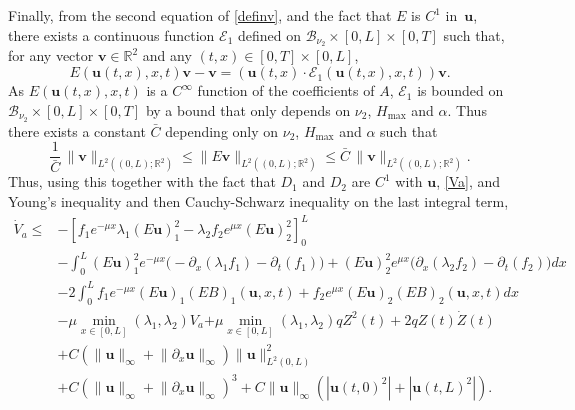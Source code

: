 \documentclass[JEP,XML,SOM,Unicode]{cedram}
\let\mathcal\mathscr
\theoremstyle{definition}
\begin{document}
Finally, from the second equation of \eqref{definv}, and the fact that $E$ is $C^{1}$ in~$\boldsymbol{u}$,
there exists a continuous function {$\mathcal{E}_{1}$} defined on $\mathcal{B}_{\nu_{2}}\times[0,L]\times[0,T]$ such that, for any vector $\boldsymbol{v}\in\mathbb{R}^{2}$ and any $(t,x)\in[0,T]\times[0,L]$,
\begin{equation}
E(\boldsymbol{u}(t,x),x,t)\boldsymbol{v}-\boldsymbol{v}=(\boldsymbol{u}(t,x)\cdot\mathcal{E}_{1}(\boldsymbol{u}(t,x),x,t))\boldsymbol{v}.
\label{recoverv}
\end{equation}
As $E(\boldsymbol{u}(t,x),x,t)$ is a $C^{\infty}$ function of the coefficients of $A$, $\mathcal{E}_{1}$ is bounded on $\mathcal{B}_{\nu_{2}}\times[0,L]\times[0,T]$ by a bound that only depends on $\nu_{2}$, $H_{\max}$ and $\alpha$.
Thus there exists a constant $\bar C$ depending only on $\nu_{2}$, $H_{\max}$ and $\alpha$ such that
\begin{equation}
\frac{1}{\bar C}\,\lVert\boldsymbol{v}\rVert_{{L^{2}((0,L);\mathbb{R}^{2})}}\leq \lVert E\boldsymbol{v}\rVert_{{L^{2}((0,L);\mathbb{R}^{2})}}\leq \bar C\, \lVert\boldsymbol{v}\rVert_{{L^{2}((0,L);\mathbb{R}^{2})}}.
\label{equivinvu}
\end{equation}
Thus, using this together with the fact that $D_{1}$ and $D_{2}$ are $C^{1}$ with $\boldsymbol{u}$, \eqref{Va}, and Young's inequality and then Cauchy-Schwarz inequality on the last integral term,
\begin{equation*}
\begin{split}
\dot V_{a}\leq& -\left[f_{1}e^{-\mu x}\lambda_{1}(E\boldsymbol{u})_{1}^{2}-\lambda_{2}f_{2}e^{\mu x}(E\boldsymbol{u})_{2}^{2}\right]_{0}^{L}\\
&-\int_{0}^{L}(E\boldsymbol{u})_{1}^{2}e^{-\mu x}\bigl(-\partial_{x}(\lambda_{1}f_{1})-\partial_{t}(f_{1})\bigr)+(E\boldsymbol{u})_{2}^{2}e^{\mu x}\bigl(\partial_{x}(\lambda_{2}f_{2})-\partial_{t}(f_{2})\bigr)dx\\
&-2\int_{0}^{L}f_{1}e^{-\mu x}(E\boldsymbol{u})_{1}(EB)_{1}(\boldsymbol{u},x,t)+f_{2}e^{\mu x}(E\boldsymbol{u})_{2}(EB)_{2}(\boldsymbol{u},x,t)dx\\
&-\mu\min\limits_{x\in[0,L]}(\lambda_{1},\lambda_{2})V_{a}{+\mu\min\limits_{x\in[0,L]}(\lambda_{1},\lambda_{2})qZ^{2}(t)}
+2qZ(t)\dot Z(t)\\
&+C\left(\lVert \boldsymbol{u}\rVert_{\infty}+\lVert \partial_{x} \boldsymbol{u}\rVert_{\infty}\right)\lVert\boldsymbol{u} \rVert_{L^{2}(0,L)}^{2}\\
&+C\left(\lVert \boldsymbol{u}\rVert_{\infty}+\lVert \partial_{x} \boldsymbol{u}\rVert_{\infty}\right)^{3}+C\lVert \boldsymbol{u}\rVert_{\infty}(|\boldsymbol{u}(t,0)^{2}|+|\boldsymbol{u}(t,L)^{2}|).
\end{split}
\end{equation*}
\end{document}
